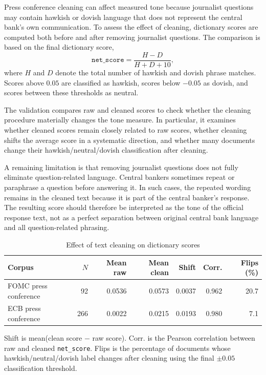 Press conference cleaning can affect measured tone because journalist
questions may contain hawkish or dovish language that does not represent
the central bank's own communication. To assess the effect of cleaning,
dictionary scores are computed both before and after removing journalist
questions. The comparison is based on the final dictionary score,
\[
  \texttt{net\_score} = \frac{H-D}{H+D+10},
\]
where \(H\) and \(D\) denote the total number of hawkish and dovish
phrase matches. Scores above \(0.05\) are classified as hawkish, scores
below \(-0.05\) as dovish, and scores between these thresholds as
neutral.

The validation compares raw and cleaned scores to check whether the
cleaning procedure materially changes the tone measure. In particular,
it examines whether cleaned scores remain closely related to raw scores,
whether cleaning shifts the average score in a systematic direction, and
whether many documents change their hawkish/neutral/dovish classification
after cleaning.

A remaining limitation is that removing journalist questions does not
fully eliminate question-related language. Central bankers sometimes
repeat or paraphrase a question before answering it. In such cases, the
repeated wording remains in the cleaned text because it is part of the
central banker's response. The resulting score should therefore be
interpreted as the tone of the official response text, not as a perfect
separation between original central bank language and all question-related
phrasing.

\begin{table}[htbp]
\centering
\caption{Effect of text cleaning on dictionary scores}
\label{tab:cleaning_validation}
\begin{threeparttable}
\small
\begin{tabular}{lrrrrrr}
\toprule
Corpus & $N$ & Mean raw & Mean clean & Shift & Corr. & Flips (\%) \\
\midrule
FOMC press conference & 92  & 0.0536 & 0.0573 & 0.0037 & 0.962 & 20.7 \\
ECB press conference  & 266 & 0.0022 & 0.0215 & 0.0193 & 0.980 & 7.1 \\
\bottomrule
\end{tabular}
\begin{tablenotes}\footnotesize
  \item[] Shift is mean(clean score $-$ raw score). Corr. is the Pearson correlation
  between raw and cleaned \texttt{net\_score}. Flips is the percentage of documents
  whose hawkish/neutral/dovish label changes after cleaning using the final
  \(\pm 0.05\) classification threshold.
\end{tablenotes}
\end{threeparttable}
\end{table}

